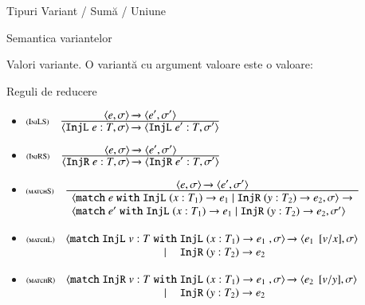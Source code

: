 \documentclass[xcolor=pdftex,romanian,colorlinks]{beamer}
\begin{document}
\begin{section}{Tipuri Variant / Sumă / Uniune}
\begin{frame}{Semantica variantelor}
\begin{block}{Valori variante. \color{black}
O variantă cu argument valoare este o valoare:}
\end{block}
\begin{block}{Reguli de reducere}
{\small
\begin{itemize}
\item[] $\reg[InjLS]{\Ss{\c{\SInjL e : T,\sigma}}{\c{\SInjL e' : T,\sigma'}}}{\Ss{\c{e,\sigma}}{\c{e',\sigma'}}}{}$
\item[] $\reg[InjRS]{\Ss{\c{\SInjR e : T,\sigma}}{\c{\SInjR e' : T,\sigma'}}}{\Ss{\c{e,\sigma}}{\c{e',\sigma'}}}{}$

\item[] $\reg[matchS]{\begin{array}{l}\c{\Smatch e \Swith {\SInjL (x:T_1) \rightarrow e_1} \mid {\SInjR (y:T_2) \rightarrow e_2},\sigma} \rightarrow \\ \c{\Smatch e' \Swith {\SInjL (x:T_1) \rightarrow e_1} \mid {\SInjR (y:T_2) \rightarrow e_2},\sigma'}\end{array}}{\Ss{\c{e,\sigma}}{\c{e',\sigma'}}}{}$

\item[] $\reg[matchL]{\Ss{\c{\Smatch {\SInjL v : T} \begin{array}[t]{@{\;}c@{\;}l@{\;}}\Swith& {\SInjL (x:T_1) \rightarrow e_1}\\  \mid & {\SInjR (y:T_2) \rightarrow e_2}\end{array},\sigma}}{\c{\substapp{e_1}{\subst{\substpair{v}{x}}},\sigma}}}{}{}$

\item[] $\reg[matchR]{\Ss{\c{\Smatch {\SInjR v : T} \begin{array}[t]{@{\;}c@{\;}l@{\;}}\Swith& {\SInjL (x:T_1) \rightarrow e_1}\\  \mid & {\SInjR (y:T_2) \rightarrow e_2}\end{array},\sigma}}{\c{\substapp{e_2}{\subst{\substpair{v}{y}}},\sigma}}}{}{}$
\end{itemize}
} 
\end{block}
\end{frame}


\end{section}
\end{document}
